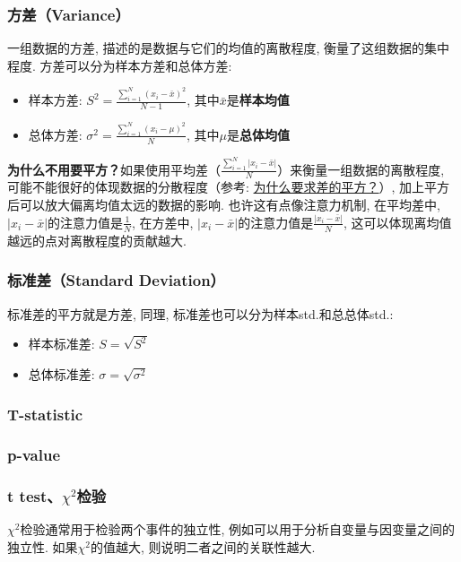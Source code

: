 \subsubsection{方差（Variance）} 一组数据的方差, 描述的是数据与它们的均值的离散程度, 衡量了这组数据的集中程度. 方差可以分为样本方差和总体方差: 
\begin{itemize}
	\item 样本方差: $S^2 = \frac{\sum_{i=1}^N(x_i - \bar{x})^2}{N-1}$, 其中$\bar{x}$是\textbf{样本均值}
	\item 总体方差: $\sigma^2 = \frac{\sum_{i=1}^N(x_i - \mu)^2}{N}$, 其中$\mu$是\textbf{总体均值}
\end{itemize}
\textbf{为什么不用要平方？}如果使用平均差（$\frac{\sum_{i=1}^N |x_i - \bar{x}|}{N}$）来衡量一组数据的离散程度, 可能不能很好的体现数据的分散程度（参考: \href{https://www.shuxuele.com/data/standard-deviation.html#WhySquare}{为什么要求差的平方？}）, 加上平方后可以放大偏离均值太远的数据的影响. 也许这有点像注意力机制, 在平均差中, $|x_i - \bar{x}|$的注意力值是$\frac{1}{N}$, 在方差中, $|x_i - \bar{x}|$的注意力值是$\frac{|x_i - \bar{x}|}{N}$, 这可以体现离均值越远的点对离散程度的贡献越大. 

\subsubsection{标准差（Standard Deviation）} 标准差的平方就是方差, 同理, 标准差也可以分为样本std.和总总体std.: 
\begin{itemize}
	\item 样本标准差: $S = \sqrt{S^2}$
	\item 总体标准差: $\sigma = \sqrt{\sigma^2}$
\end{itemize}

\subsubsection{T-statistic }


\subsubsection{p-value }

\subsubsection{t test、$\chi^2$检验}
$\chi^2$检验通常用于检验两个事件的独立性, 例如可以用于分析自变量与因变量之间的独立性. 如果$\chi^2$的值越大, 则说明二者之间的关联性越大. 

